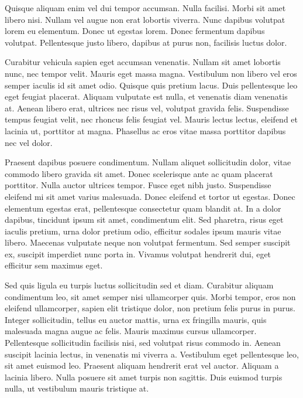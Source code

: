 		Quisque aliquam enim vel dui tempor accumsan. Nulla facilisi. Morbi sit amet libero nisi. Nullam vel augue non erat lobortis viverra. Nunc dapibus volutpat lorem eu elementum. Donec ut egestas lorem. Donec fermentum dapibus volutpat. Pellentesque justo libero, dapibus at purus non, facilisis luctus dolor.

		Curabitur vehicula sapien eget accumsan venenatis. Nullam sit amet lobortis nunc, nec tempor velit. Mauris eget massa magna. Vestibulum non libero vel eros semper iaculis id sit amet odio. Quisque quis pretium lacus. Duis pellentesque leo eget feugiat placerat. Aliquam vulputate est nulla, et venenatis diam venenatis at. Aenean libero erat, ultrices nec risus vel, volutpat gravida felis. Suspendisse tempus feugiat velit, nec rhoncus felis feugiat vel. Mauris lectus lectus, eleifend et lacinia ut, porttitor at magna. Phasellus ac eros vitae massa porttitor dapibus nec vel dolor.

		Praesent dapibus posuere condimentum. Nullam aliquet sollicitudin dolor, vitae commodo libero gravida sit amet. Donec scelerisque ante ac quam placerat porttitor. Nulla auctor ultrices tempor. Fusce eget nibh justo. Suspendisse eleifend mi sit amet varius malesuada. Donec eleifend et tortor ut egestas. Donec elementum egestas erat, pellentesque consectetur quam blandit at. In a dolor dapibus, tincidunt ipsum sit amet, condimentum elit. Sed pharetra, risus eget iaculis pretium, urna dolor pretium odio, efficitur sodales ipsum mauris vitae libero. Maecenas vulputate neque non volutpat fermentum. Sed semper suscipit ex, suscipit imperdiet nunc porta in. Vivamus volutpat hendrerit dui, eget efficitur sem maximus eget.

		Sed quis ligula eu turpis luctus sollicitudin sed et diam. Curabitur aliquam condimentum leo, sit amet semper nisi ullamcorper quis. Morbi tempor, eros non eleifend ullamcorper, sapien elit tristique dolor, non pretium felis purus in purus. Integer sollicitudin, tellus eu auctor mattis, urna ex fringilla mauris, quis malesuada magna augue ac felis. Mauris maximus cursus ullamcorper. Pellentesque sollicitudin facilisis nisi, sed volutpat risus commodo in. Aenean suscipit lacinia lectus, in venenatis mi viverra a. Vestibulum eget pellentesque leo, sit amet euismod leo. Praesent aliquam hendrerit erat vel auctor. Aliquam a lacinia libero. Nulla posuere sit amet turpis non sagittis. Duis euismod turpis nulla, ut vestibulum mauris tristique at.

